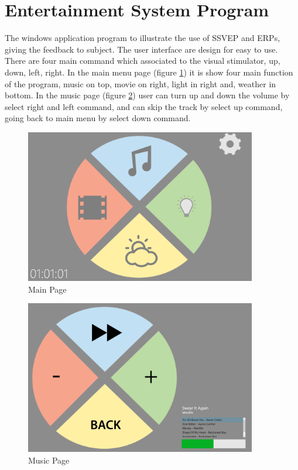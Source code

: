 \section{Entertainment System Program}
\hspace{1.5cm}The windows application program to illustrate the use of SSVEP and ERPs, giving the feedback to subject. The user interface are design for easy to use. There are four main command which associated to the visual stimulator, up, down, left, right. In the main menu page (figure \ref{fig:main}) it is show four main function of the program, music on top, movie on right, light in right and, weather in bottom. In the music page (figure \ref{fig:music}) user can turn up and down the volume by select right and left command, and can skip the track by select up command, going back to main menu by select down command.



\begin{figure}[H]
	\centering
	\includegraphics[width=0.9\textwidth]{chapter6/pagemain.png}
	\caption{Main Page}
	\label{fig:main}
\end{figure}
\begin{figure}[H]
		\centering
	\includegraphics[width=0.9\textwidth]{chapter6/pagemusic.png}
	\caption{Music Page}
	\label{fig:music}
\end{figure}

